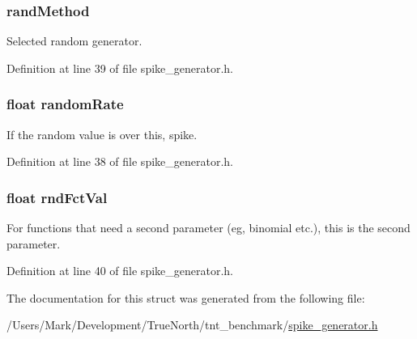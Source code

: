 \subsubsection[{rand\+Method}]{ rand\+Method}\label{structrandom_spikes_a39c666ed4c7b487b1586c2c01b5afcdc}


Selected random generator. 



Definition at line 39 of file spike\+\_\+generator.\+h.

\hypertarget{structrandom_spikes_a1333eb5695ae83d1ffccf24b08bc6288}{}
\subsubsection[{random\+Rate}]{\setlength{\rightskip}{0pt plus 5cm}float random\+Rate}\label{structrandom_spikes_a1333eb5695ae83d1ffccf24b08bc6288}


If the random value is over this, spike. 



Definition at line 38 of file spike\+\_\+generator.\+h.

\hypertarget{structrandom_spikes_a0eb8199754a403ccc8eac256f9193a02}{}
\subsubsection[{rnd\+Fct\+Val}]{\setlength{\rightskip}{0pt plus 5cm}float rnd\+Fct\+Val}\label{structrandom_spikes_a0eb8199754a403ccc8eac256f9193a02}


For functions that need a second parameter (eg, binomial etc.), this is the second parameter. 



Definition at line 40 of file spike\+\_\+generator.\+h.



The documentation for this struct was generated from the following file\+:\begin{DoxyCompactItemize}
\item 
/\+Users/\+Mark/\+Development/\+True\+North/tnt\+\_\+benchmark/\hyperlink{spike__generator_8h}{spike\+\_\+generator.\+h}\end{DoxyCompactItemize}

